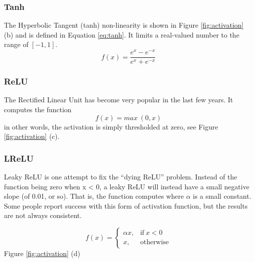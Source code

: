 \subsubsection{Tanh}

The Hyperbolic Tangent (tanh) non-linearity is shown in Figure \ref{fig:activation} (b) and is defined in Equation \ref{eq:tanh}. It limits a real-valued number to the range of $[-1, 1]$. 
\begin{equation}
f(x) = \frac{e^x - e^{-x}}{e^x + e^{-x}}
\label{eq:tanh}
\end{equation}

\subsubsection{ReLU}

The Rectified Linear Unit has become very popular in the last few years. It computes the function 
\begin{equation}
f(x)=max \: (0,x)
\label{eq:relu}
\end{equation}
in other words, the activation is simply thresholded at zero, see Figure \ref{fig:activation} (c). 

\subsubsection{LReLU}

 Leaky ReLU is one attempt to fix the “dying ReLU” problem. Instead of the function being zero when x < 0, a leaky ReLU will instead have a small negative slope (of 0.01, or so). That is, the function computes where $\alpha$ is a small constant. Some people report success with this form of activation function, but the results are not always consistent. 

\begin{equation}
f(x)=\begin{cases}
      \alpha x, & \text{if}\ x < 0\\
      x, & \text{otherwise}
    \end{cases}
\label{eq:lrelu}
\end{equation}
Figure \ref{fig:activation} (d)

%
%

